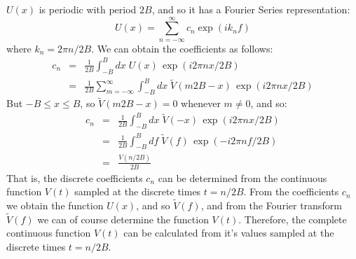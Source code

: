 \documentclass[12pt,oneside]{book}
\begin{document}
$U(x)$ is periodic with period $2B$, and so it has a Fourier Series representation:
\begin{displaymath}
U(x) = \sum_{n=-\infty}^{\infty} c_n \exp(i k_n f) 
\end{displaymath}
where $k_n = 2 \pi n / 2B$.   We can obtain the coefficients as follows:
\begin{eqnarray*}
c_n &=& \frac{1}{2B} \int_{-B}^{B} dx \; U(x) \, \exp(i 2 \pi n x / 2B)\\
&=& \frac{1}{2B}  \sum_{m=-\infty}^{\infty} \int_{-B}^{B} dx \; \widetilde{V}(m2B-x) \, \exp(i 2 \pi n x / 2B)
\end{eqnarray*}
But $-B \leq x \leq B$, so $\widetilde{V}(m2B-x) = 0$ whenever $m \neq 0$, and so:
\begin{eqnarray*}
c_n &=& \frac{1}{2B} \int_{-B}^{B} dx \; \widetilde{V}(-x) \, \exp(i 2 \pi n x / 2B) \\
&=& \frac{1}{2B} \int_{-B}^{B} df \; \widetilde{V}(f) \, \exp(-i 2 \pi n f / 2B) \\
&=& \frac{V(n / 2B)}{2B}
\end{eqnarray*}
That is, the discrete coefficients $c_n$ can be determined from the continuous function $V(t)$ sampled at the discrete times $t = n / 2B$.  From the coefficients $c_n$ we obtain the function $U(x)$, and so $\widetilde{V}(f)$, and from the Fourier transform $\widetilde{V}(f)$ we can of course determine the function $V(t)$.  Therefore, the complete continuous function $V(t)$ can be calculated from it's values sampled at the discrete times $t = n / 2B$. 
\end{document}
